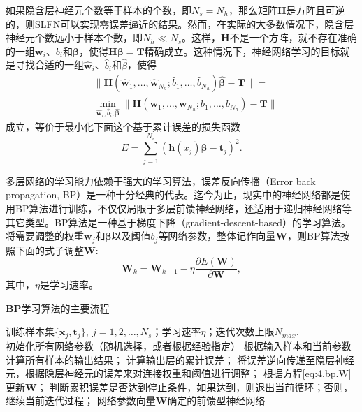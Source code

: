 如果隐含层神经元个数等于样本的个数，即$N_{s}=N_{h}$，那么矩阵$\bm{H}$是方阵且可逆的，则SLFN可以实现零误差逼近的结果。然而，在实际的大多数情况下，隐含层神经元个数远小于样本个数，即$N_{h}\ll N_{s}$。这样，$\bm{H}$不是一个方阵，就不存在准确的一组$\bm{w}_{i}$、$b_{i}$和$\bm{\beta}$，使得$\bm{H}\bm{\beta}=\bm{T}$精确成立。这种情况下，神经网络学习的目标就是寻找合适的一组$\hat{\bm{w}}_{i}$、$\hat{b}_{i}$和$\hat{\beta}$，使得
\begin{equation}\label{eq:4.nn.H-T}
\begin{split}%
&\|\bm{H}(\hat{\bm{w}}_{1},\dots,\hat{\bm{w}}_{N_{h}};\hat{b}_{1},\dots,\hat{b}_{N_{h}})\hat{\bm{\beta}}-\bm{T}\|=\\
&\min_{\hat{\bm{w}}_{i},\hat{b}_{i},\hat{\bm{\beta}}}\|\bm{H}(\bm{w}_{1},\dots,\bm{w}_{N_{h}};b_{1},\dots,b_{N_{h}})-\bm{T}\|
\end{split}
\end{equation}
成立，等价于最小化下面这个基于累计误差的损失函数
\begin{equation}\label{eq:4.nn.cost}
E=\sum_{j=1}^{N_{s}}(\bm{h}(x_{j})\bm{\beta}-\bm{t}_{j})^{2}.
\end{equation}

多层网络的学习能力依赖于强大的学习算法，误差反向传播（Error back propagation, BP）是一种十分经典的代表。迄今为止，现实中的神经网络都是使用BP算法进行训练，不仅仅局限于多层前馈神经网络，还适用于递归神经网络等其它类型。BP算法是一种基于梯度下降（gradient-descent-based）的学习算法。将需要调整的权重$\bm{w}_{j}$和$\bm{\beta}$以及阈值$b_{j}$等网络参数，整体记作向量$\bm{W}$，则BP算法按照下面的式子调整$\bm{W}$:
\begin{equation}\label{eq:4.bp.W}
\bm{W}_{k} = \bm{W}_{k-1}-\eta\frac{\partial E(\bm{W})}{\partial\bm{W}},
\end{equation}
其中，$\eta$是学习速率。

\begin{algo}
\caption{$\mathbf{BP}$学习算法的主要流程}
\label{alg.bp}
\begin{algorithmic}%
\REQUIRE 训练样本集$\{\bm{x}_{j},\bm{t}_{j}\},\ j=1,2,\ldots,N_{s}$；学习速率$\eta$；迭代次数上限$N_{max}$.\\
\STATE 初始化所有网络参数（随机选择，或者根据经验指定）
  \STATE 根据输入样本和当前参数计算所有样本的输出结果；
  \STATE 计算输出层的累计误差；
  \STATE 将误差逆向传递至隐层神经元，根据隐层神经元的误差来对连接权重和阈值进行调整；
  \STATE 根据方程\eqref{eq:4.bp.W}更新$\bm{W}$；
  \STATE 判断累积误差是否达到停止条件，如果达到，则退出当前循环；否则，继续当前迭代过程；
\ENDFOR
\ENSURE 网络参数向量$\bm{W}$确定的前馈型神经网络\\
\end{algorithmic}
\end{algo}

